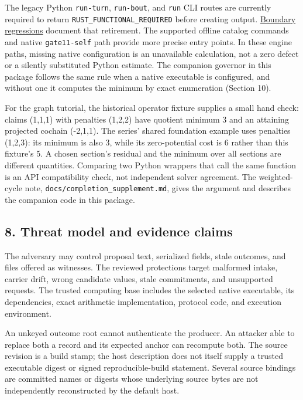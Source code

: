 \documentclass[
  11pt,
]{article}
\newcommand{\passthrough}[1]{#1}
\begin{document}
The legacy Python \passthrough{\lstinline!run-turn!},
\passthrough{\lstinline!run-bout!}, and \passthrough{\lstinline!run!}
CLI routes are currently required to return
\nolinkurl{RUST_FUNCTIONAL_REQUIRED} before creating output.
\href{https://github.com/dbccpage/the_symbol_game/blob/52cb5457f6c485ba548cfd292f6012a941ed22cf/pfp/tests/test_functional_boundary.py}{Boundary
regressions} document that retirement. The supported offline catalog
commands and native \passthrough{\lstinline!gate11-self!} path provide
more precise entry points. In these engine paths, missing native
configuration is an unavailable calculation, not a zero defect or a
silently substituted Python estimate. The companion governor in this
package follows the same rule when a native executable is configured,
and without one it computes the minimum by exact enumeration (Section
10).

For the graph tutorial, the historical operator fixture supplies a small
hand check: claims (1,1,1) with penalties (1,2,2) have quotient minimum
3 and an attaining projected cochain (-2,1,1). The series' shared
foundation example uses penalties (1,2,3): its minimum is also 3, while
its zero-potential cost is 6 rather than this fixture's 5. A chosen
section's residual and the minimum over all sections are different
quantities. Comparing two Python wrappers that call the same function is
an API compatibility check, not independent solver agreement. The
weighted-cycle note, \nolinkurl{docs/completion_supplement.md}, gives
the argument and describes the companion code in this package.

\subsection{8. Threat model and evidence
claims}\label{threat-model-and-evidence-claims}

The adversary may control proposal text, serialized fields, stale
outcomes, and files offered as witnesses. The reviewed protections
target malformed intake, carrier drift, wrong candidate values, stale
commitments, and unsupported requests. The trusted computing base
includes the selected native executable, its dependencies, exact
arithmetic implementation, protocol code, and execution environment.

An unkeyed outcome root cannot authenticate the producer. An attacker
able to replace both a record and its expected anchor can recompute
both. The source revision is a build stamp; the host description does
not itself supply a trusted executable digest or signed
reproducible-build statement. Several source bindings are committed
names or digests whose underlying source bytes are not independently
reconstructed by the default host.
\end{document}
